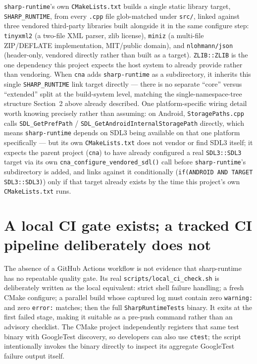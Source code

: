 \texttt{sharp-runtime}'s own \texttt{CMakeLists.txt} builds a single static library target,
\texttt{SHARP\_RUNTIME}, from every \texttt{.cpp} file glob-matched under \texttt{src/}, linked
against three vendored third-party libraries built alongside it in the same configure step:
\texttt{tinyxml2} (a two-file XML parser, zlib license), \texttt{miniz} (a multi-file ZIP/DEFLATE
implementation, MIT/public domain), and \texttt{nlohmann/json} (header-only, vendored directly
rather than built as a target). \texttt{ZLIB::ZLIB} is the one dependency this project expects
the host system to already provide rather than vendoring. When \texttt{cna} adds
\texttt{sharp-runtime} as a subdirectory, it inherits this single \texttt{SHARP\_RUNTIME} link
target directly --- there is no separate ``core'' versus ``extended'' split at the build-system
level, matching the single-namespace-tree structure Section~2 above already described. One
platform-specific wiring detail worth knowing precisely rather than assuming: on Android,
\texttt{StoragePaths.cpp} calls \texttt{SDL\_GetPrefPath} / \texttt{SDL\_GetAndroidInternalStoragePath}
directly, which means \texttt{sharp-runtime} depends on SDL3 being available on that one
platform specifically --- but its own \texttt{CMakeLists.txt} does not vendor or find SDL3
itself; it expects the parent project (\texttt{cna}) to have already configured a real
\texttt{SDL3::SDL3} target via its own \texttt{cna\_configure\_vendored\_sdl()} call before
\texttt{sharp-runtime}'s subdirectory is added, and links against it conditionally
(\texttt{if(ANDROID AND TARGET SDL3::SDL3)}) only if that target already exists by the time this
project's own \texttt{CMakeLists.txt} runs.

\section{A local CI gate exists; a tracked CI pipeline deliberately does not}

The absence of a GitHub Actions workflow is not evidence that sharp-runtime has no repeatable
quality gate. Its real \texttt{scripts/local\_ci\_check.sh} is deliberately written as the
local equivalent: strict shell failure handling; a fresh CMake configure; a parallel build whose
captured log must contain zero \texttt{warning:} and zero \texttt{error:} matches; then the
full \texttt{SharpRuntimeTests} binary. It exits at the first failed stage, making it suitable
as a pre-push command rather than an advisory checklist. The CMake project independently
registers that same test binary with GoogleTest discovery, so developers can also use
\texttt{ctest}; the script intentionally invokes the binary directly to inspect its aggregate
GoogleTest failure output itself.

